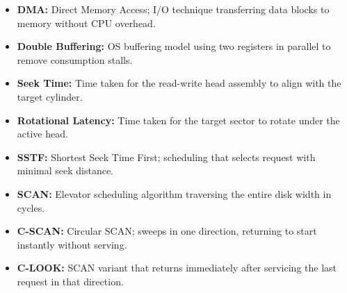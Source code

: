 \documentclass[12pt,a4paper]{article}
\begin{document}
\begin{tcolorbox}[defbox, title={\textbf{One-Line Definitions}}]
\begin{itemize}[leftmargin=*, itemsep=2.5pt, topsep=0pt]
  \item \textbf{DMA:} Direct Memory Access; I/O technique transferring data blocks to memory without CPU overhead.
  \item \textbf{Double Buffering:} OS buffering model using two registers in parallel to remove consumption stalls.
  \item \textbf{Seek Time:} Time taken for the read-write head assembly to align with the target cylinder.
  \item \textbf{Rotational Latency:} Time taken for the target sector to rotate under the active head.
  \item \textbf{SSTF:} Shortest Seek Time First; scheduling that selects request with minimal seek distance.
  \item \textbf{SCAN:} Elevator scheduling algorithm traversing the entire disk width in cycles.
  \item \textbf{C-SCAN:} Circular SCAN; sweeps in one direction, returning to start instantly without serving.
  \item \textbf{C-LOOK:} SCAN variant that returns immediately after servicing the last request in that direction.
\end{itemize}
\end{tcolorbox}
\end{document}
